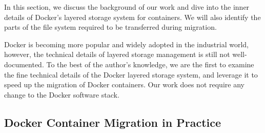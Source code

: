 
In this section, we discuss the background of our work and dive into the inner details of Docker's layered storage system for containers. We will also identify the parts of the file system required to be transferred during migration. 

Docker is becoming more popular and widely adopted in the industrial world, however, the technical details of layered storage management is still not well-documented. 
To the best of the author's knowledge, we are the first to examine the fine technical details of the Docker layered storage system, and leverage it to speed up the migration of Docker containers. Our work does not require any change to the Docker software stack.





\subsection{Docker Container Migration in Practice }\label{migpractice}




